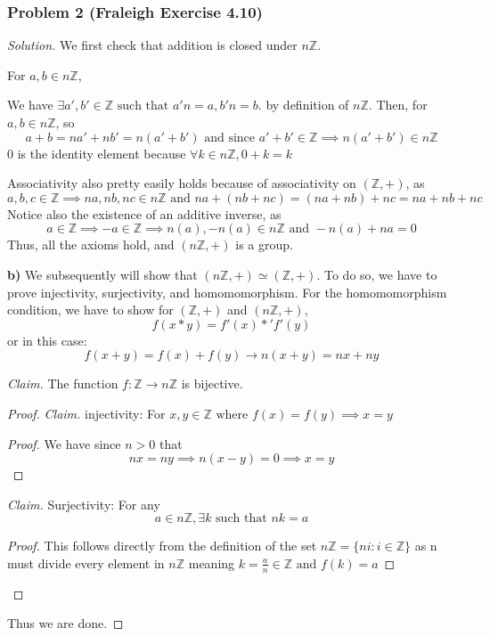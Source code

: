 \documentclass[11pt]{article}
\newcommand{\1}{\mathbf{1}}
\theoremstyle{definition}
\newenvironment{solution}{\begin{proof}[Solution]}{\end{proof}}
\begin{document}
\subsubsection*{Problem 2 (Fraleigh Exercise 4.10)}
\begin{solution}
We first check that addition is closed under $n\mathbb{Z}.$\par For $a, b \in n\mathbb{Z}$,

\par We have $\exists a', b' \in \mathbb{Z} \text{ such that } a' n = a, b' n = b.$ by
definition of $n\mathbb{Z}.$
Then, for $a, b \in n\mathbb{Z}$, so $$a + b = na' + nb' = n(a' + b') \text{ and since } a' + b' \in
\mathbb{Z} \implies n(a' + b') \in n\mathbb{Z}$$ 
0 is the identity element because $\forall k \in n\mathbb{Z}, 0 + k = k$
\par Associativity also pretty easily holds because of associativity on $(\mathbb{Z},
+)$, as 
$$a, b, c \in \mathbb{Z} \implies na, nb, nc \in n\mathbb{Z} \text{ and } na + (nb + nc) = (na + nb) + nc = na +  nb + nc$$
Notice also the existence of an additive inverse, as $$a \in \mathbb{Z} \implies -a\in
\mathbb{Z} \implies n(a), -n(a) \in n\mathbb{Z} \text{ and } -n(a) + na = 0$$
Thus, all the axioms hold, and $(n\mathbb{Z}, +)$ is a group.

\textbf{b) } We subsequently will show that $(n\mathbb{Z}, +) \simeq (\mathbb{Z}, +).$
To do so, we have to prove injectivity, surjectivity, and homomomorphism.
For the homomomorphism condition, we have to show for $(\mathbb{Z}, +)$ and
$(n\mathbb{Z}, +)$, 
$$f(x * y) = f'(x) *' f'(y)$$ or in this case: 
$$f(x + y)= f(x) + f(y) \rightarrow n(x + y) = nx + ny$$
\par \noindent\textit{Claim.} The function $f : \mathbb{Z} \rightarrow n \mathbb{Z}$ is
bijective.

\begin{proof}
    \noindent\textit{Claim.} injectivity:         For $x, y \in  \mathbb{Z} \text{ where } f(x) = f(y) \implies x = y$
    \begin{proof}
        We have since $n > 0$ that $$nx = ny \implies n(x - y) = 0 \implies x = y$$
    \end{proof}
\noindent\textit{Claim.} Surjectivity: For any $$a \in n\mathbb{Z}, \exists k \text{ such
that } nk = a$$

    \begin{proof}
        This follows directly from the definition of the set $n\mathbb{Z} = \{ni : i \in
        \mathbb{Z}\}  $
        as n must divide every element in $n\mathbb{Z}$ meaning $k = \frac{a}{n}\in \mathbb{Z} \text{ and } f(k) = a$ 
    \end{proof}
\end{proof}
Thus we are done.
\end{solution}
\end{document}
